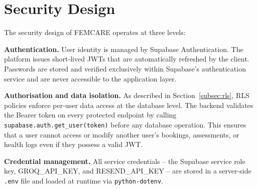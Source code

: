 \section{Security Design}
\label{sec:security-design}

The security design of FEMCARE operates at three levels:

\textbf{Authentication.} User identity is managed by Supabase Authentication. The platform issues short-lived JWTs that are automatically refreshed by the client. Passwords are stored and verified exclusively within Supabase's authentication service and are never accessible to the application layer.

\textbf{Authorisation and data isolation.} As described in Section~\ref{subsec:rls}, RLS policies enforce per-user data access at the database level. The backend validates the Bearer token on every protected endpoint by calling \texttt{supabase.auth.get\_user(token)} before any database operation. This ensures that a user cannot access or modify another user's bookings, assessments, or health logs even if they possess a valid JWT.

\textbf{Credential management.} All service credentials -- the Supabase service role key, GROQ\_API\_KEY, and RESEND\_API\_KEY -- are stored in a server-side \texttt{.env} file and loaded at runtime via \texttt{python-dotenv}. \cite{kotz2016}

